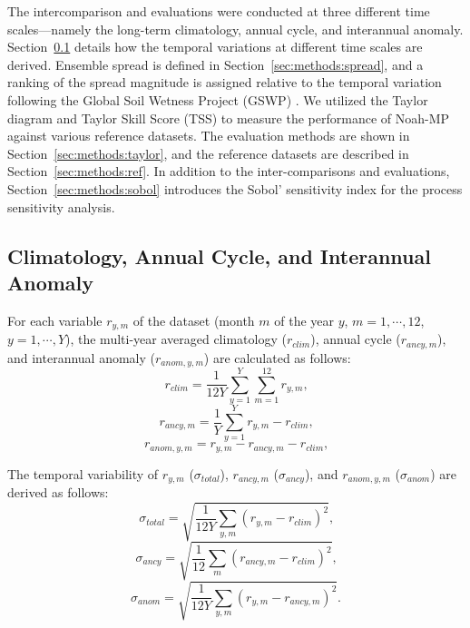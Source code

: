 \documentclass[essd, manuscript]{copernicus}
\begin{document}
The intercomparison and evaluations were conducted at three different time scales---namely the long-term climatology, annual cycle, and interannual anomaly. Section~\ref{sec:methods:variables} details how the temporal variations at different time scales are derived. Ensemble spread is defined in Section~\ref{sec:methods:spread}, and a ranking of the spread magnitude is assigned relative to the temporal variation following the Global Soil Wetness Project (GSWP) \citep{dirmeyer2006BAMS}. We utilized the Taylor diagram and Taylor Skill Score (TSS) to measure the performance of Noah-MP against various reference datasets. The evaluation methods are shown in Section~\ref{sec:methods:taylor}, and the reference datasets are described in Section~\ref{sec:methods:ref}. In addition to the inter-comparisons and evaluations, Section~\ref{sec:methods:sobol} introduces the Sobol' sensitivity index for the process sensitivity analysis.

\subsection{Climatology, Annual Cycle, and Interannual Anomaly}\label{sec:methods:variables}

For each variable \(r_{y,m}\) of the dataset (month \(m\) of the year \(y\), \(m=1, \cdots, 12\), \(y=1, \cdots, Y\)), the multi-year averaged climatology (\(r_{clim}\)), annual cycle (\(r_{ancy,m}\)), and interannual anomaly (\(r_{anom,y,m}\)) are calculated as follows:
\begin{equation}
  r_{clim} = \frac{1}{12 Y} \sum_{y=1}^{Y} \sum_{m=1}^{12} r_{y,m}
  \text{,}
\end{equation}
\begin{equation}
  r_{ancy,m} = \frac{1}{Y} \sum_{y=1}^{Y} {r_{y,m} - r_{clim}}
  \text{,}
\end{equation}
\begin{equation}
  r_{anom,y,m} = r_{y,m} - r_{ancy,m} - r_{clim}
  \text{,}
\end{equation}

The temporal variability of \(r_{y,m}\) (\(\sigma_{total}\)), \(r_{ancy,m}\) (\(\sigma_{ancy}\)), and \(r_{anom,y,m}\) (\(\sigma_{anom}\)) are derived as follows:
\begin{equation}
  \sigma_{total} = \sqrt{\frac{1}{12 Y}\sum_{y,m} (r_{y,m} - r_{clim})^2}
  \label{eq:var:total}
  \text{,}
\end{equation}
\begin{equation}
  \sigma_{ancy} = \sqrt{\frac{1}{12}\sum_{m} (r_{ancy,m} - r_{clim})^2}
  \text{,}
\end{equation}
\begin{equation}
  \sigma_{anom} = \sqrt{\frac{1}{12 Y} \sum_{y,m} (r_{y,m} - r_{ancy,m})^2}
  \text{.}
\end{equation}
\end{document}
